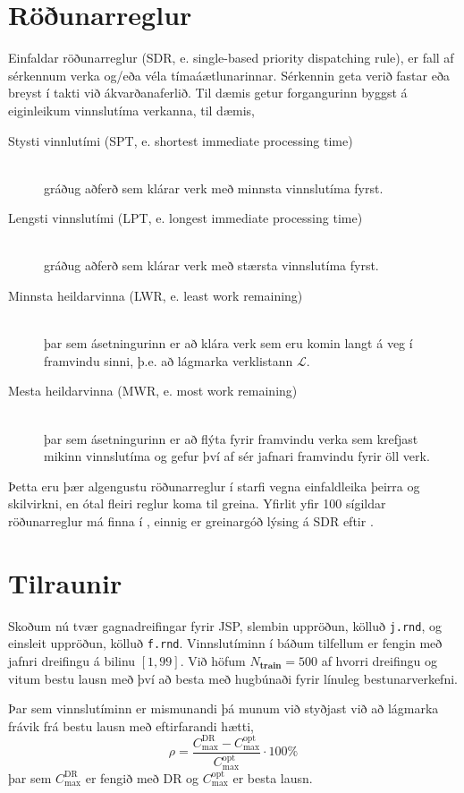 \documentclass[10pt,a4paper]{article}
\begin{document}
\section*{Röðunarreglur}
Einfaldar röðunarreglur (SDR, e. single-based priority dispatching rule), er 
fall af sérkennum verka og/eða véla tímaáætlunarinnar. Sérkennin geta verið 
fastar eða breyst í takti við ákvarðanaferlið. Til dæmis getur forgangurinn 
byggst á eiginleikum vinnslutíma verkanna, til dæmis, 
\begin{description}
    \item[Stysti vinnlutími (SPT, e. shortest immediate processing time)] 
    \hfill \\ gráðug aðferð sem klárar verk með minnsta vinnslutíma fyrst. 
    \item[Lengsti vinnslutími (LPT, e. longest immediate processing time)] 
    \hfill \\ gráðug aðferð sem klárar verk með stærsta vinnslutíma fyrst. 
    \item[Minnsta heildarvinna (LWR, e. least work remaining)] \hfill \\
    þar sem ásetningurinn er að klára verk sem eru komin langt á veg í 
    framvindu sinni, þ.e. að lágmarka verklistann $\mathcal{L}$.
    \item[Mesta heildarvinna (MWR, e. most work remaining)] \hfill \\
    þar sem ásetningurinn er að flýta fyrir framvindu verka sem krefjast mikinn 
    vinnslutíma og gefur því af sér jafnari framvindu fyrir öll verk.
\end{description}
Þetta eru þær algengustu röðunarreglur í starfi vegna einfaldleika þeirra og 
skilvirkni, en ótal fleiri reglur koma til greina. Yfirlit yfir 100 
sígildar röðunarreglur má finna í \citet{Panwalkar77}, einnig er greinargóð 
lýsing á SDR eftir \citet{Haupt89}. 

\section*{Tilraunir}
Skoðum nú tvær gagnadreifingar fyrir JSP, slembin
uppröðun, kölluð \texttt{j.rnd}, og einsleit uppröðun, kölluð \texttt{f.rnd}. 
Vinnslutíminn í báðum tilfellum er fengin með jafnri dreifingu á bilinu 
$[1,99]$.
Við höfum $N_{\textbf{train}}=500$ af hvorri dreifingu og vitum bestu lausn 
með því að besta með hugbúnaði fyrir línuleg bestunarverkefni. 

Þar sem vinnslutíminn er mismunandi þá munum við styðjast við að lágmarka 
frávik frá bestu lausn með eftirfarandi hætti, 
\begin{equation}
\rho=\frac{C_{\max}^{\text{DR}}-C_{\max}^{\text{opt}}}{C_{\max}^{\text{opt}}}
\cdot 100\%
\end{equation}
þar sem $C_{\max}^{\text{DR}}$ er fengið með DR og $C_{\max}^{\text{opt}}$ er 
besta lausn. 
\end{document}
